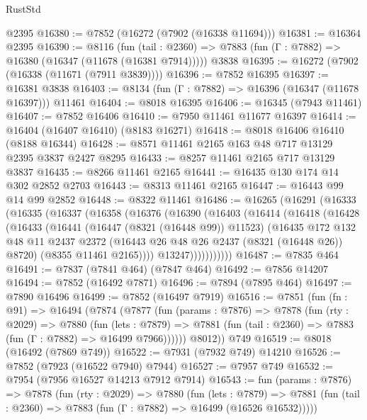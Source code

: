 \begin{lexlean}{RustStd}
\begin{coremodule}
    @2395
@16380 := @7852 (@16272 (@7902 (@16338 @11694)))
@16381 := @16364 @2395
@16390 := @8116
    (fun (tail : @2360) => @7883 (fun (Γ : @7882) => @16380 (@16347 (@11678 (@16381 @7914)))))
    @3838
@16395 := @16272 (@7902 (@16338 (@11671 (@7911 @3839))))
@16396 := @7852 @16395
@16397 := @16381 @3838
@16403 := @8134 (fun (Γ : @7882) => @16396 (@16347 (@11678 @16397))) @11461
@16404 := @8018 @16395
@16406 := @16345 (@7943 @11461)
@16407 := @7852 @16406
@16410 := @7950 @11461 @11677 @16397
@16414 := @16404 (@16407 @16410) (@8183 @16271)
@16418 := @8018 @16406 @16410 (@8188 @16344)
@16428 := @8571 @11461 @2165 @163 @48 @717 @13129 @2395 @3837 @2427 @8295
@16433 := @8257 @11461 @2165 @717 @13129 @3837
@16435 := @8266 @11461 @2165
@16441 := @16435 @130 @174 @14 @302 @2852 @2703
@16443 := @8313 @11461 @2165
@16447 := @16443 @99 @14 @99 @2852
@16448 := @8322 @11461
@16486 := @16265
    (@16291
      (@16333
        (@16335
          (@16337
            (@16358
              (@16376
                (@16390
                  (@16403
                    (@16414
                      (@16418
                        (@16428
                          (@16433
                            (@16441
                              (@16447 (@8321 (@16448 @99)) @11523)
                              (@16435
                                @172
                                @132
                                @48
                                @11
                                @2437
                                @2372
                                (@16443 @26 @48 @26 @2437 (@8321 (@16448 @26)) @8720)
                                (@8355 @11461 @2165))))
                          @13247)))))))))))
@16487 := @7835 @464
@16491 := @7837 (@7841 @464) (@7847 @464)
@16492 := @7856 @14207
@16494 := @7852 (@16492 @7871)
@16496 := @7894 (@7895 @464)
@16497 := @7890 @16496
@16499 := @7852 (@16497 @7919)
@16516 := @7851
    (fun (fn : @91) =>
    @16494
      (@7874
        (@7877
          (fun (params : @7876) =>
          @7878
            (fun (rty : @2029) =>
            @7880
              (fun (lets : @7879) =>
              @7881 (fun (tail : @2360) => @7883 (fun (Γ : @7882) => @16499 @7966))))))
        @8012))
    @749
@16519 := @8018 (@16492 (@7869 @749))
@16522 := @7931 (@7932 @749) @14210
@16526 := @7852 (@7923 (@16522 @7940) @7944)
@16527 := @7957 @749
@16532 := @7954 (@7956 @16527 @14213 @7912 @7914)
@16543 := fun (params : @7876) =>
  @7878
    (fun (rty : @2029) =>
    @7880
      (fun (lets : @7879) =>
      @7881 (fun (tail : @2360) => @7883 (fun (Γ : @7882) => @16499 (@16526 @16532)))))

\end{coremodule}
\end{lexlean}

